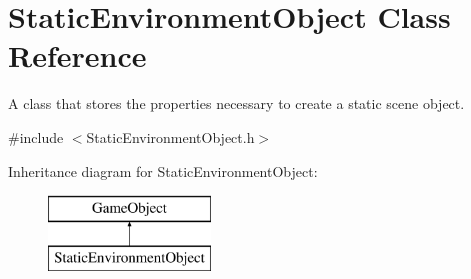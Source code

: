 \hypertarget{class_static_environment_object}{}\section{Static\+Environment\+Object Class Reference}
\label{class_static_environment_object}


A class that stores the properties necessary to create a static scene object.  




{\ttfamily \#include $<$Static\+Environment\+Object.\+h$>$}

Inheritance diagram for Static\+Environment\+Object\+:\begin{figure}[H]
\begin{center}
\leavevmode
\includegraphics[height=2.000000cm]{class_static_environment_object}
\end{center}
\end{figure}

